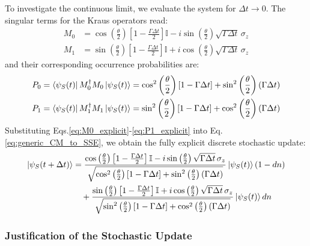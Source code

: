 \documentclass[a4paper,12pt]{article}
\begin{document}
To investigate the continuous limit, we evaluate the system for $\Delta t \rightarrow 0$. The singular terms for the Kraus operators read:
\begin{align}
	M_{0} &= \cos\left(\frac{\theta}{2}\right) \left[1 - \frac{\Gamma \Delta t}{2}\right] \mathbb{I} - i \sin\left(\frac{\theta}{2}\right) \sqrt{\Gamma \Delta t} \, \sigma_{z} \label{eq:M0_explicit} \\
	M_{1} &= \sin\left(\frac{\theta}{2}\right) \left[1 - \frac{\Gamma \Delta t}{2}\right] \mathbb{I} + i \cos\left(\frac{\theta}{2}\right) \sqrt{\Gamma \Delta t} \, \sigma_{z} \label{eq:M1_explicit}
\end{align}
and their corresponding occurrence probabilities are:
\begin{align}
	P_{0} &= \bra{\psi_{S}(t)} M_{0}^{\dagger} M_{0} \ket{\psi_{S}(t)}
	= \cos^{2}\left(\frac{\theta}{2}\right) [1-\Gamma\Delta t]
	+ \sin^{2}\left(\frac{\theta}{2}\right) (\Gamma\Delta t) \label{eq:P0_explicit} \\
	P_{1} &= \bra{\psi_{S}(t)} M_{1}^{\dagger} M_{1} \ket{\psi_{S}(t)}
	= \sin^{2}\left(\frac{\theta}{2}\right) [1-\Gamma\Delta t]
	+ \cos^{2}\left(\frac{\theta}{2}\right) (\Gamma\Delta t) \label{eq:P1_explicit}
\end{align}
Substituting Eqs.\ref{eq:M0_explicit}-\ref{eq:P1_explicit} into Eq.\ref{eq:generic_CM_to_SSE}, we obtain the fully explicit discrete stochastic update:
\begin{align}
	\ket{\psi_{S}(t + \Delta t)} &= 
	\frac{\cos\left(\frac{\theta}{2}\right) \left[1 - \frac{\Gamma \Delta t}{2}\right] \mathbb{I} - i \sin\left(\frac{\theta}{2}\right) \sqrt{\Gamma \Delta t} \, \sigma_{z}}
	{\sqrt{\cos^{2}\left(\frac{\theta}{2}\right)[1-\Gamma\Delta t] + \sin^{2}\left(\frac{\theta}{2}\right)(\Gamma\Delta t)}} \ket{\psi_{S}(t)} (1 - dn) \notag \\
	&\quad + \frac{\sin\left(\frac{\theta}{2}\right) \left[1 - \frac{\Gamma \Delta t}{2}\right] \mathbb{I} + i \cos\left(\frac{\theta}{2}\right) \sqrt{\Gamma \Delta t} \, \sigma_{z}}
	{\sqrt{\sin^{2}\left(\frac{\theta}{2}\right)[1-\Gamma\Delta t] + \cos^{2}\left(\frac{\theta}{2}\right)(\Gamma\Delta t)}} \ket{\psi_{S}(t)} dn
	\label{eq:complete_dw_evolved}
\end{align}

\subsubsection{Justification of the Stochastic Update}
\label{subsub:justification_unraveling}
\end{document}
